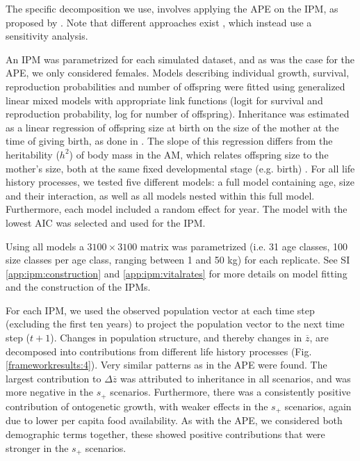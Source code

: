 The specific decomposition we use, involves applying the APE on the IPM, as proposed by \cite{Coulson2010}. Note that different approaches exist \parencite[e.g.][]{Coulson2011modeling,traill2014demography}, which instead use a sensitivity analysis.

An IPM was parametrized for each simulated dataset, and as was the case for the APE, we only considered females. Models describing individual growth, survival, reproduction probabilities and number of offspring were fitted using generalized linear mixed models with appropriate link functions (logit for survival and reproduction probability, log for number of offspring). Inheritance was estimated as a linear regression of offspring size at birth on the size of the mother at the time of giving birth, as done in \cite{traill2014demography}. The slope of this regression differs from the heritability ($h^2$) of body mass in the AM, which relates offspring size to the mother's size, both at the same fixed developmental stage (e.g. birth) \parencite{chevin2015}. For all life history processes, we tested five different models: a full model containing age, size and their interaction, as well as all models nested within this full model. Furthermore, each model included a random effect for year. The model with the lowest AIC was selected and used for the IPM.


Using all models a $3100\times3100$ matrix was parametrized (i.e. 31 age classes, 100 size classes per age class, ranging between 1 and 50 kg) for each replicate. See SI \ref{app:ipm:construction} and \ref{app:ipm:vitalrates} for more details on model fitting and the construction of the IPMs.

For each IPM, we used the observed population vector at each time step (excluding the first ten years) to project the population vector to the next time step ($t+1$). Changes in population structure, and thereby changes in $\overline z$, are decomposed into contributions from different life history processes (Fig. \ref{frameworkresults:4}). Very similar patterns as in the APE were found. The largest contribution to $\Delta \overline z$ was attributed to inheritance in all scenarios, and was more negative in the $s_+$ scenarios. Furthermore, there was a consistently positive contribution of ontogenetic growth, with weaker effects in the $s_+$ scenarios, again due to lower per capita food availability. As with the APE, we considered both demographic terms together, these showed positive contributions that were stronger in the $s_+$ scenarios.


